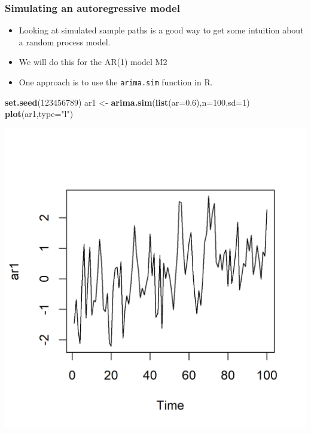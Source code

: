 \documentclass[]{article}
\newenvironment{Shaded}{\begin{snugshade}}{\end{snugshade}}
\newcommand{\KeywordTok}[1]{\textcolor[rgb]{0.13,0.29,0.53}{\textbf{#1}}}
\newcommand{\DataTypeTok}[1]{\textcolor[rgb]{0.13,0.29,0.53}{#1}}
\newcommand{\DecValTok}[1]{\textcolor[rgb]{0.00,0.00,0.81}{#1}}
\newcommand{\FloatTok}[1]{\textcolor[rgb]{0.00,0.00,0.81}{#1}}
\newcommand{\StringTok}[1]{\textcolor[rgb]{0.31,0.60,0.02}{#1}}
\newcommand{\NormalTok}[1]{#1}
\begin{document}
\subsubsection{Simulating an autoregressive
model}\label{simulating-an-autoregressive-model}

\begin{itemize}
\item
  Looking at simulated sample paths is a good way to get some intuition
  about a random process model.
\item
  We will do this for the AR(1) model M2
\item
  One approach is to use the \texttt{arima.sim} function in R.
\end{itemize}

\begin{Shaded}
\begin{Highlighting}[]
\KeywordTok{set.seed}\NormalTok{(}\DecValTok{123456789}\NormalTok{)}
\NormalTok{ar1 <-}\StringTok{ }\KeywordTok{arima.sim}\NormalTok{(}\KeywordTok{list}\NormalTok{(}\DataTypeTok{ar=}\FloatTok{0.6}\NormalTok{),}\DataTypeTok{n=}\DecValTok{100}\NormalTok{,}\DataTypeTok{sd=}\DecValTok{1}\NormalTok{)}
\KeywordTok{plot}\NormalTok{(ar1,}\DataTypeTok{type=}\StringTok{"l"}\NormalTok{)}
\end{Highlighting}
\end{Shaded}

\includegraphics{figure/intro-ar_arima_sim-1.png}
\end{document}
